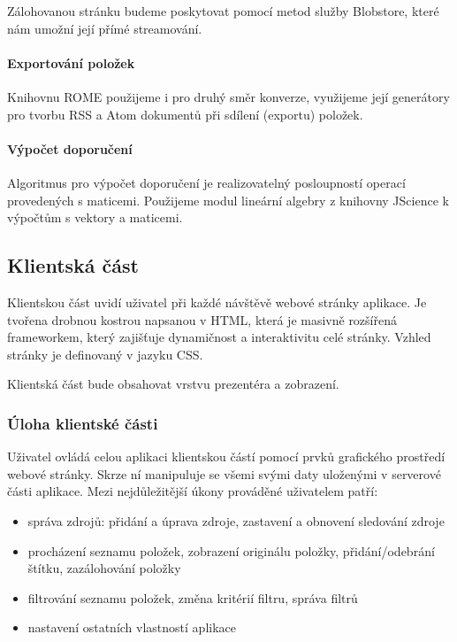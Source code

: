 Zálohovanou stránku budeme poskytovat pomocí metod služby Blobstore, které nám umožní její přímé streamování.

\paragraph{Exportování položek}
Knihovnu ROME použijeme i pro druhý směr konverze, využijeme její generátory pro tvorbu RSS a Atom dokumentů při sdílení (exportu) položek.

\paragraph{Výpočet doporučení}
Algoritmus pro výpočet doporučení je realizovatelný posloupností operací provedených s maticemi.
Použijeme modul lineární algebry z knihovny JScience k výpočtům s vektory a maticemi.

\subsection{Klientská část}

Klientskou část uvidí uživatel při každé návštěvě webové stránky aplikace.
Je tvořena drobnou kostrou napsanou v HTML, která je masivně rozšířená  frameworkem, který zajišťuje dynamičnost a interaktivitu celé stránky.
Vzhled stránky je definovaný v jazyku CSS.

Klientská část bude obsahovat vrstvu prezentéra a zobrazení.

\subsubsection{Úloha klientské části}

Uživatel ovládá celou aplikaci klientskou částí pomocí prvků grafického prostředí webové stránky.
Skrze ní manipuluje se všemi svými daty uloženými v serverové části aplikace.
Mezi nejdůležitější úkony prováděné uživatelem patří:
\begin{itemize}
	\item správa zdrojů: přidání a úprava zdroje, zastavení a obnovení sledování zdroje
	\item procházení seznamu položek, zobrazení originálu položky, přidání/odebrání štítku, zazálohování položky
	\item filtrování seznamu položek, změna kritérií filtru, správa filtrů
	\item nastavení ostatních vlastností aplikace
\end{itemize}

